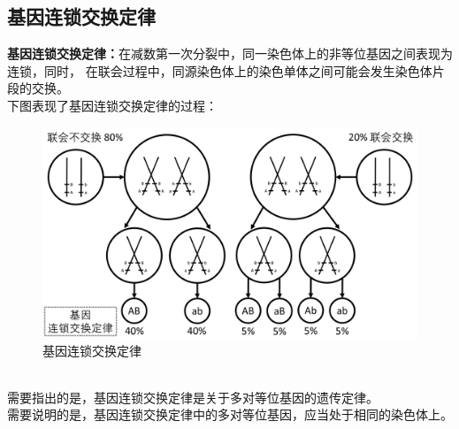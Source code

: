 \documentclass[UTF8]{ctexart}
\begin{document}
\subsection{基因连锁交换定律}
    \textbf{基因连锁交换定律：}在减数第一次分裂中，同一染色体上的非等位基因之间表现为连锁，同时，
    在联会过程中，同源染色体上的染色单体之间可能会发生染色体片段的交换。\\[3mm]
    下图表现了基因连锁交换定律的过程：\vspace{10pt}
    \begin{figure}[h]
        \begin{center}
            \includegraphics[width=14cm]{BiologyImage/59.jpg}
        \end{center}
        \caption{基因连锁交换定律}
    \end{figure}\\[1mm]
    需要指出的是，基因连锁交换定律是关于多对等位基因的遗传定律。\\[3mm]
    需要说明的是，基因连锁交换定律中的多对等位基因，应当处于相同的染色体上。

\newpage
\end{document}
